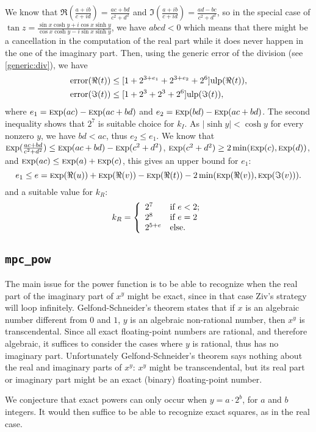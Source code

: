 \documentclass {article}
\newcommand {\Ulp}{{\rm ulp}}
\DeclareMathOperator{\error}{error}
\DeclareMathOperator{\Exp}{{\rm \textsc exp}}
\begin{document}
We know that $\Re(\frac{a+i b}{c+i d})=\frac{a c +b d}{c^2 + d^2}$ and
$\Im(\frac{a+i b}{c+i d})=\frac{a d -b c}{c^2 + d^2}$, so in the special case
of $\tan z=\frac{\sin x\cosh y+i\cos x\sinh y}{\cos x\cosh y-i\sin x\sinh y}$,
we have $abcd < 0$ which means that there might be a cancellation in the
computation of the real part while it does never happen in the one of the
imaginary part.  Then, using the generic error of the division (see
\ref{generic:div}), we have
\begin{align*}
\error(\Re(t)) &\leq [1+2^{3+e_1}+2^{3+e_2}+2^6] \Ulp(\Re(t)),
\\
\error(\Im(t)) &\leq [1+2^3+2^3+2^6] \Ulp(\Im(t)),
\end{align*}
where $e_1=\Exp(a c) -\Exp(a c+b d)$ and $e_2=\Exp(b d) -\Exp(a c+b d)$.  The
second inequality shows that $2^7$ is suitable choice for $k_I$. As $|\sinh
y|<\cosh y$ for every nonzero $y$, we have $bd<ac$, thus $e_2\leq e_1$. We
know that $\Exp(\frac{a c+b d}{c^2+d^2})\leq \Exp(a c+b d) -\Exp(c^2+d^2)$,
$\Exp(c^2+d^2)\geq2 \min(\Exp(c), \Exp(d))$, and $\Exp(ac) \leq \Exp(a) +
\Exp(c)$, this gives an upper bound for $e_1$:
\[
e_1 \leq e = \Exp(\Re(u)) +\Exp(\Re(v)) -\Exp(\Re(t))
-2 \min(\Exp(\Re(v)), \Exp(\Im(v))).
\]
and a suitable value for $k_R$:
\begin{equation*}
k_R=\left\{
\begin{array}{l l}
  2^7 & \mbox{if $e < 2$;}
  \\
  2^8 & \mbox{if $e = 2$}
  \\
  2^{5 + e} & \mbox{else.}
\end{array}
\right.
\end{equation*}

\subsection {\texttt {mpc\_pow}}

The main issue for the power function is to be able to recognize when the
real part of the imaginary part of $x^y$ might be exact, since in that case
Ziv's strategy will loop infinitely.
Gelfond-Schneider's theorem states that if $x$ is an algebraic number
different from $0$ and $1$, $y$ is an algebraic non-rational number,
then $x^y$ is transcendental.
Since all exact floating-point numbers are rational, and therefore algebraic,
it suffices to consider the cases where $y$ is rational, thus has no
imaginary part.
Unfortunately Gelfond-Schneider's theorem says nothing about the real and
imaginary parts of $x^y$: $x^y$ might be transcendental, but its real part
or imaginary part might be an exact (binary) floating-point number.

We conjecture that exact powers can only occur when
$y = a \cdot 2^b$, for $a$ and $b$ integers. It would then suffice to
be able to recognize exact squares, as in the real case.



\end{document}
